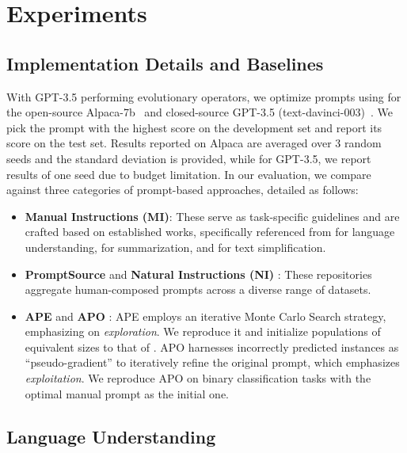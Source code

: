 
\section{Experiments}
\subsection{Implementation Details and Baselines}
With GPT-3.5 performing evolutionary operators, we optimize prompts using \modelname for the open-source Alpaca-7b~\citep{alpaca} and closed-source GPT-3.5 (text-davinci-003)~\citep{brown2020language}.
We pick the prompt with the highest score on the development set and report its score on the test set.
Results reported on Alpaca are averaged over 3 random seeds and the standard deviation is provided, while for GPT-3.5, we report results of one seed due to budget limitation. 
In our evaluation, we compare \modelname against three categories of prompt-based approaches, detailed as follows:
\begin{itemize}[leftmargin=*]
    \item \textbf{Manual Instructions (MI)}: These serve as task-specific guidelines and are crafted based on established works, specifically referenced from \citet{zhang2023sentiment} for language understanding, \citet{sanh2021multitask} for summarization, and \citet{zhang2023multi} for text simplification.
    \item \textbf{PromptSource} \citep{bach2022promptsource} and \textbf{Natural Instructions (NI)} \citep{mishra2022cross}: These repositories aggregate human-composed prompts across a diverse range of datasets. 
    \item \textbf{APE} \citep{zhou2022large} and \textbf{APO} \citep{pryzant2023automatic}: APE employs an iterative Monte Carlo Search strategy, emphasizing on \emph{exploration}. We reproduce it and initialize populations of equivalent sizes to that of \modelname. APO harnesses incorrectly predicted instances as ``pseudo-gradient'' to iteratively refine the original prompt, which emphasizes \emph{exploitation}. We reproduce APO on binary classification tasks with the optimal manual prompt as the initial one.
\end{itemize}









\subsection{Language Understanding}
